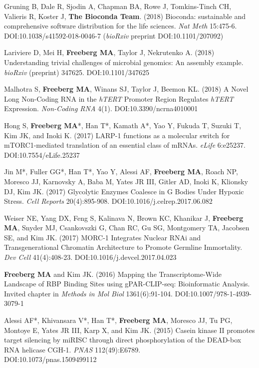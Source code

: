 \documentclass[margin,line]{res}
\begin{document}
\begin{resume}
Gruning B, Dale R, Sjodin A, Chapman BA, Rowe J, Tomkins-Tinch CH, Valieris R, Koster J, {\bf The Bioconda Team}. (2018) Bioconda: sustainable and comprehensive software distribution for the life sciences. {\em Nat Meth} 15:475-6. DOI:10.1038/s41592-018-0046-7 ({\em bioRxiv} preprint DOI:10.1101/207092)

Lariviere D, Mei H, {\bf Freeberg MA}, Taylor J, Nekrutenko A. (2018) Understanding trivial challenges of microbial genomics: An assembly example. {\em bioRxiv} (preprint) 347625. DOI:10.1101/347625

Malhotra S, {\bf Freeberg MA}, Winans SJ, Taylor J, Beemon KL. (2018) A Novel Long Non-Coding RNA in the {\em hTERT} Promoter Region Regulates {\em hTERT} Expression. {\em Non-Coding RNA} 4(1). DOI:10.3390/ncrna4010001

Hong S, {\bf Freeberg MA}*, Han T*, Kamath A*, Yao Y, Fukuda T, Suzuki T, Kim JK, and Inoki K. (2017) LARP-1 functions as a molecular switch for mTORC1-mediated translation of an essential class of mRNAs. {\em eLife} 6:e25237. DOI:10.7554/eLife.25237

Jin M*, Fuller GG*, Han T*, Yao Y, Alessi AF, {\bf Freeberg MA}, Roach NP, Moresco JJ, Karnovsky A, Baba M, Yates JR III, Gitler AD, Inoki K, Klionsky DJ, Kim JK. (2017) Glycolytic Enzymes Coalesce in G Bodies Under Hypoxic Stress. {\em Cell Reports} 20(4):895-908. DOI:10.1016/j.celrep.2017.06.082

Weiser NE, Yang DX, Feng S, Kalinava N, Brown KC, Khanikar J, {\bf Freeberg MA}, Snyder MJ, Csankovszki G, Chan RC,  Gu SG, Montgomery TA, Jacobsen SE, and Kim JK. (2017) MORC-1 Integrates Nuclear RNAi and Transgenerational Chromatin Architecture to Promote Germline Immortality. {\em Dev Cell} 41(4):408-23. DOI:10.1016/j.devcel.2017.04.023


{\bf Freeberg MA} and Kim JK. (2016) Mapping the Transcriptome-Wide Landscape of RBP Binding Sites using gPAR-CLIP-seq: Bioinformatic Analysis. Invited chapter in {\em Methods in Mol Biol} 1361(6):91-104. DOI:10.1007/978-1-4939-3079-1

Alessi AF*, Khivansara V*, Han T*, {\bf Freeberg MA}, Moresco JJ, Tu PG, Montoye E, Yates JR III, Karp X, and Kim JK. (2015) Casein kinase II promotes target silencing by miRISC through direct phosphorylation of the DEAD-box RNA helicase CGH-1. {\em PNAS} 112(49):E6789. \\DOI:10.1073/pnas.1509499112


\end{resume}
\end{document}
